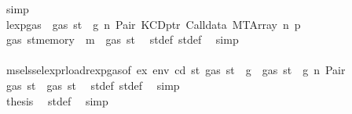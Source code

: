 \begin{isabellebody}
\ simp\isanewline
\ \ \ \ \ \ \ \ \ \ \ \ \ \ \ \ \ \ \ \ \ \ \ \ \ \ \ \ \ \ \isamarkupfalse%
\ \isamarkupfalse%
\ lexp{\isacharunderscore}{\kern0pt}gas\ {\isacharbackquoteopen}{\isasymnot}\ gas\ st\ {\isasymle}\ g{\isacharbackquoteclose}\ n\ Pair\ KCDptr\ Calldata\ MTArray\ n{}\ p{}\ \isamarkupfalse%
\ {\isachardoublequoteopen}gas\ {\isacharparenleft}{\kern0pt}st{\isacharprime}{\kern0pt}{\isacharprime}{\kern0pt}{\isacharprime}{\kern0pt}{\isasymlparr}memory\ {\isacharcolon}{\kern0pt}{\isacharequal}{\kern0pt}\ m{\isacharprime}{\kern0pt}{\isasymrparr}{\isacharparenright}{\kern0pt}\ {\isasymle}\ gas\ st{\isacharprime}{\kern0pt}{\isacharprime}{\kern0pt}{\isachardoublequoteclose}\ \isamarkupfalse%
\ st{\isacharprime}{\kern0pt}{\isacharprime}{\kern0pt}{\isacharunderscore}{\kern0pt}def\ st{\isacharprime}{\kern0pt}{\isacharprime}{\kern0pt}{\isacharprime}{\kern0pt}{\isacharunderscore}{\kern0pt}def\ \isamarkupfalse%
\ simp\isanewline
\ \ \ \ \ \ \ \ \ \ \ \ \ \ \ \ \ \ \ \ \ \ \ \ \ \ \ \ \ \ \isamarkupfalse%
\ \isamarkupfalse%
\ msel{\isacharunderscore}{\kern0pt}ssel{\isacharunderscore}{\kern0pt}expr{\isacharunderscore}{\kern0pt}load{\isacharunderscore}{\kern0pt}rexp{\isacharunderscore}{\kern0pt}gas{\isacharparenleft}{\kern0pt}{}{\isacharparenright}{\kern0pt}{\isacharbrackleft}{\kern0pt}of\ ex\ env\ cd\ st{\isacharprime}{\kern0pt}\ {\isachardoublequoteopen}gas\ st\ {\isacharminus}{\kern0pt}\ g{\isachardoublequoteclose}{\isacharbrackright}{\kern0pt}\ {\isacharbackquoteopen}{\isasymnot}\ gas\ st\ {\isasymle}\ g{\isacharbackquoteclose}\ n\ Pair\ \isamarkupfalse%
\ {\isachardoublequoteopen}gas\ st{\isacharprime}{\kern0pt}{\isacharprime}{\kern0pt}\ {\isasymle}\ gas\ st{\isacharprime}{\kern0pt}{\isachardoublequoteclose}\ \isamarkupfalse%
\ st{\isacharprime}{\kern0pt}{\isacharunderscore}{\kern0pt}def\ st{\isacharprime}{\kern0pt}{\isacharprime}{\kern0pt}{\isacharunderscore}{\kern0pt}def\ \isamarkupfalse%
\ simp\isanewline
\ \ \ \ \ \ \ \ \ \ \ \ \ \ \ \ \ \ \ \ \ \ \ \ \ \ \ \ \ \ \isamarkupfalse%
\ \isamarkupfalse%
\ {\isacharquery}{\kern0pt}thesis\ \isamarkupfalse%
\ st{\isacharprime}{\kern0pt}{\isacharunderscore}{\kern0pt}def\ \isamarkupfalse%
\ simp\isanewline
\ \ \ \ \ \ \ \ \ \ \ \ \ \ \ \ \ \ \ \ \ \ \ \ \ \ \ \ \isamarkupfalse%
\isanewline
\ \ \ \ \ \ \ \ \ \ \ \ \ \ \ \ \ \ \ \ \ \ \ \ \ \ \isamarkupfalse%

\end{isabellebody}
